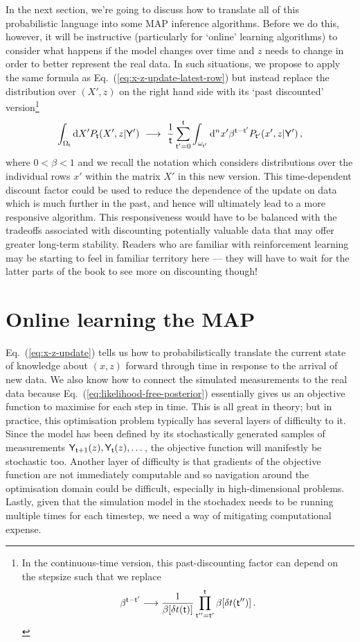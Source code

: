 In the next section, we're going to discuss how to translate all of this probabilistic language into some MAP inference algorithms. Before we do this, however, it will be instructive (particularly for `online' learning algorithms) to consider what happens if the model changes over time and $z$ needs to change in order to better represent the real data. In such situations, we propose to apply the same formula as Eq.~(\ref{eq:x-z-update-latest-row}) but instead replace the distribution over $(X',z)$ on the right hand side with its `past discounted' version\footnote{In the continuous-time version, this past-discounting factor can depend on the stepsize such that we replace
$$
\beta^{{\sf t}-{\sf t}'} \longrightarrow \frac{1}{\beta [\delta t({\sf t})]}\prod_{{\sf t}''={\sf t}'}^{{\sf t}} \beta [\delta t({\sf t}'')] \,.
$$} 
\begin{align}
\int_{\Omega_{{\sf t}}}{\rm d}X' P_{{\sf t}}(X',z\vert {\sf Y}') \,\, \longrightarrow \,\, \frac{1}{{\sf t}}\sum_{{\sf t}'=0}^{{\sf t}}\int_{\omega_{{\sf t}'}}{\rm d}^nx' \beta^{{\sf t}-{\sf t}'} P_{{\sf t}'}(x',z\vert {\sf Y}') \,,
\end{align}
where $0 < \beta < 1$ and we recall the notation which considers distributions over the individual rows $x'$ within the matrix $X'$ in this new version. This time-dependent discount factor could be used to reduce the dependence of the update on data which is much further in the past, and hence will ultimately lead to a more responsive algorithm. This responsiveness would have to be balanced with the tradeoffs associated with discounting potentially valuable data that may offer greater long-term stability. Readers who are familiar with reinforcement learning may be starting to feel in familiar territory here --- they will have to wait for the latter parts of the book to see more on discounting though!

\section{\sffamily Online learning the MAP}

Eq.~(\ref{eq:x-z-update}) tells us how to probabilistically translate the current state of knowledge about $(x,z)$ forward through time in response to the arrival of new data. We also know how to connect the simulated measurements to the real data because Eq.~(\ref{eq:likelihood-free-posterior}) essentially gives us an objective function to maximise for each step in time. This is all great in theory; but in practice, this optimisation problem typically has several layers of difficulty to it. Since the model has been defined by its stochastically generated samples of measurements ${\sf Y}_{{\sf t}+1}(z), {\sf Y}_{{\sf t}}(z), \dots$, the objective function will manifestly be stochastic too. Another layer of difficulty is that gradients of the objective function are not immediately computable and so navigation around the optimisation domain could be difficult, especially in high-dimensional problems. Lastly, given that the simulation model in the stochadex needs to be running multiple times for each timestep, we need a way of mitigating computational expense. 

